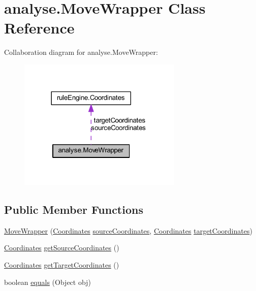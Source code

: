 \hypertarget{classanalyse_1_1_move_wrapper}{}\section{analyse.\+Move\+Wrapper Class Reference}
\label{classanalyse_1_1_move_wrapper}


Collaboration diagram for analyse.\+Move\+Wrapper\+:
\nopagebreak
\begin{figure}[H]
\begin{center}
\leavevmode
\includegraphics[width=221pt]{classanalyse_1_1_move_wrapper__coll__graph}
\end{center}
\end{figure}
\subsection*{Public Member Functions}
\begin{DoxyCompactItemize}
\item 
\mbox{\hyperlink{classanalyse_1_1_move_wrapper_a61f841f79d6e29cbb55cbe2417e0b07b}{Move\+Wrapper}} (\mbox{\hyperlink{classrule_engine_1_1_coordinates}{Coordinates}} \mbox{\hyperlink{classanalyse_1_1_move_wrapper_af196805fcb3f688de2743f24ac1d45d3}{source\+Coordinates}}, \mbox{\hyperlink{classrule_engine_1_1_coordinates}{Coordinates}} \mbox{\hyperlink{classanalyse_1_1_move_wrapper_a62f9fb14450668e15cc2df3014e8545c}{target\+Coordinates}})
\item 
\mbox{\hyperlink{classrule_engine_1_1_coordinates}{Coordinates}} \mbox{\hyperlink{classanalyse_1_1_move_wrapper_a626a8a9e56b2d1ec8d49d5d028e707c8}{get\+Source\+Coordinates}} ()
\item 
\mbox{\hyperlink{classrule_engine_1_1_coordinates}{Coordinates}} \mbox{\hyperlink{classanalyse_1_1_move_wrapper_ae9b1716d7aeab0e925cdd62494667366}{get\+Target\+Coordinates}} ()
\item 
boolean \mbox{\hyperlink{classanalyse_1_1_move_wrapper_a5da45f4f59ecceb13f6d3c2957e0b458}{equals}} (Object obj)
\end{DoxyCompactItemize}
